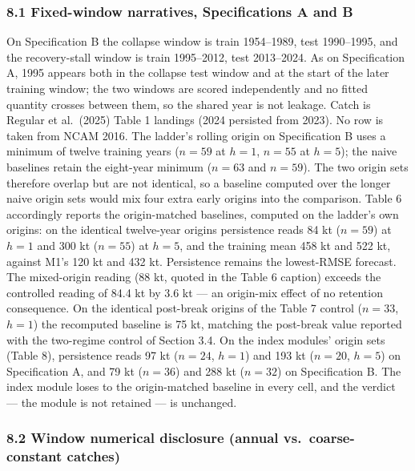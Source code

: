 \documentclass[11pt]{article}
\begin{document}
\subsubsection{8.1 Fixed-window narratives, Specifications A and
B}\label{fixed-window-narratives-specifications-a-and-b}

On Specification B the collapse window is train 1954--1989, test
1990--1995, and the recovery-stall window is train 1995--2012, test
2013--2024. As on Specification A, 1995 appears both in the collapse
test window and at the start of the later training window; the two
windows are scored independently and no fitted quantity crosses between
them, so the shared year is not leakage. Catch is Regular et al.~(2025)
Table 1 landings (2024 persisted from 2023). No row is taken from NCAM
2016. The ladder's rolling origin on Specification B uses a minimum of
twelve training years (\(n=59\) at \(h=1\), \(n=55\) at \(h=5\)); the
naive baselines retain the eight-year minimum (\(n=63\) and \(n=59\)).
The two origin sets therefore overlap but are not identical, so a
baseline computed over the longer naive origin sets would mix four extra
early origins into the comparison. Table 6 accordingly reports the
origin-matched baselines, computed on the ladder's own origins: on the
identical twelve-year origins persistence reads 84 kt (\(n=59\)) at
\(h=1\) and 300 kt (\(n=55\)) at \(h=5\), and the training mean 458 kt
and 522 kt, against M1's 120 kt and 432 kt. Persistence remains the
lowest-RMSE forecast. The mixed-origin reading (88 kt, quoted in the
Table 6 caption) exceeds the controlled reading of 84.4 kt by 3.6 kt ---
an origin-mix effect of no retention consequence. On the identical
post-break origins of the Table 7 control (\(n=33\), \(h=1\)) the
recomputed baseline is 75 kt, matching the post-break value reported
with the two-regime control of Section 3.4. On the index modules' origin
sets (Table 8), persistence reads 97 kt (\(n=24\), \(h=1\)) and 193 kt
(\(n=20\), \(h=5\)) on Specification A, and 79 kt (\(n=36\)) and 288 kt
(\(n=32\)) on Specification B. The index module loses to the
origin-matched baseline in every cell, and the verdict --- the module is
not retained --- is unchanged.

\subsubsection{8.2 Window numerical disclosure (annual
vs.~coarse-constant
catches)}\label{window-numerical-disclosure-annual-vs.-coarse-constant-catches}
\end{document}
